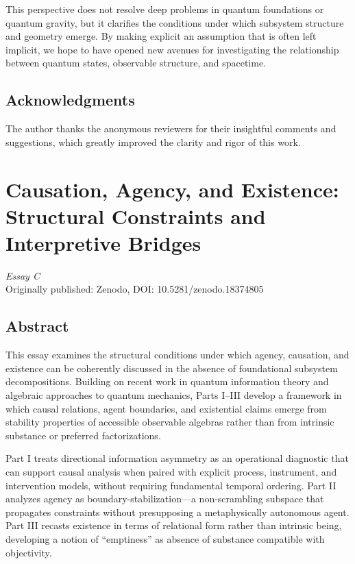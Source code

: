 \documentclass[12pt,a4paper,openany]{book}
\begin{document}
This perspective does not resolve deep problems in quantum foundations or quantum gravity, but it clarifies the conditions under which subsystem structure and geometry emerge. By making explicit an assumption that is often left implicit, we hope to have opened new avenues for investigating the relationship between quantum states, observable structure, and spacetime.

\section*{Acknowledgments}

The author thanks the anonymous reviewers for their insightful comments and suggestions, which greatly improved the clarity and rigor of this work.

\chapter{Causation, Agency, and Existence: Structural Constraints and Interpretive Bridges}
\label{H-chap:paperC}

\begin{center}
\textit{Essay C}\\[0.5em]
Originally published: Zenodo, DOI: 10.5281/zenodo.18374805
\end{center}

\bigskip

\section*{Abstract}
This essay examines the structural conditions under which agency, causation, and existence can be coherently discussed in the absence of foundational subsystem decompositions. Building on recent work in quantum information theory and algebraic approaches to quantum mechanics, Parts I--III develop a framework in which causal relations, agent boundaries, and existential claims emerge from stability properties of accessible observable algebras rather than from intrinsic substance or preferred factorizations.

Part I treats directional information asymmetry as an operational diagnostic that can support causal analysis when paired with explicit process, instrument, and intervention models, without requiring fundamental temporal ordering. Part II analyzes agency as boundary-stabilization—a non-scrambling subspace that propagates constraints without presupposing a metaphysically autonomous agent. Part III recasts existence in terms of relational form rather than intrinsic being, developing a notion of ``emptiness'' as absence of substance compatible with objectivity.
\end{document}
